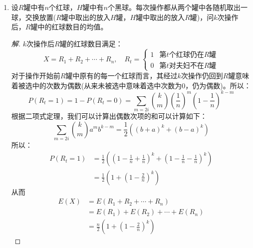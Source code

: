 \documentclass[12pt]{article}
\newcommand{\hei}{\CJKfamily{hei}}                          %
\begin{document}
\begin{enumerate}
\item {\hei 设$R$罐中有$n$个红球，$H$罐中有$n$个黑球。每次操作都从两个罐中各随机取出一球，交换放置($R$罐中取出的放入$H$罐，$H$罐中取出的放入$R$罐)，问$k$次操作后，$R$罐中的红球数目的均值。}

\begin{proof}[解]
	$k$次操作后$R$罐的红球数目满足：
	\begin{equation}
	X=R_1+R_2+\cdots+R_n,\quad R_t=\left\{
	\begin{array}{cc}
	1 & \mbox{第$t$个红球仍在$R$罐}\\
	0 & \mbox{第$t$对夫妇不在$R$罐}
	\end{array}
	\right.
	\end{equation}
	对于操作开始前$R$罐中原有的每一个红球而言，其经过$k$次操作仍回到$R$罐意味着被选中的次数为偶数(从来未被选中意味着选中次数为0，仍为偶数)。所以：
	\begin{equation}
	P(R_t=1)=1-P(R_t=0)=\sum_{m=2i}\binom{k}{m}\left(\frac{1}{n}\right)^m\left(1-\frac{1}{n}\right)^{k-m}
	\end{equation}
	根据二项式定理，我们可以计算出偶数次项的和可以计算如下：
	\begin{equation}
	\sum_{m=2i}\binom{k}{m}a^mb^{k-m}=\frac{1}{2}\left(\left(b+a\right)^k+\left(b-a\right)^k\right)
	\end{equation}
	所以：
	\begin{equation}\begin{aligned}
	P(R_t=1)&=\frac{1}{2}\left(\left(1-\frac{1}{n}+\frac{1}{n}\right)^k+\left(1-\frac{1}{n}-\frac{1}{n}\right)^k\right) \\
	&=\frac{1}{2}\left(1+\left(1-\frac{2}{n}\right)^k\right) 
	\end{aligned}
	\end{equation}
	从而
	\begin{equation}
	\begin{aligned}
	E(X)&=E(R_1+R_2+\cdots+R_n) \\
	&=E(R_1)+E(R_2)+\cdots+E(R_n) \\
	&=\frac{n}{2}\left(1+\left(1-\frac{2}{n}\right)^k\right)
	\end{aligned}
	\end{equation}
\end{proof}
\end{enumerate}
\end{document}
